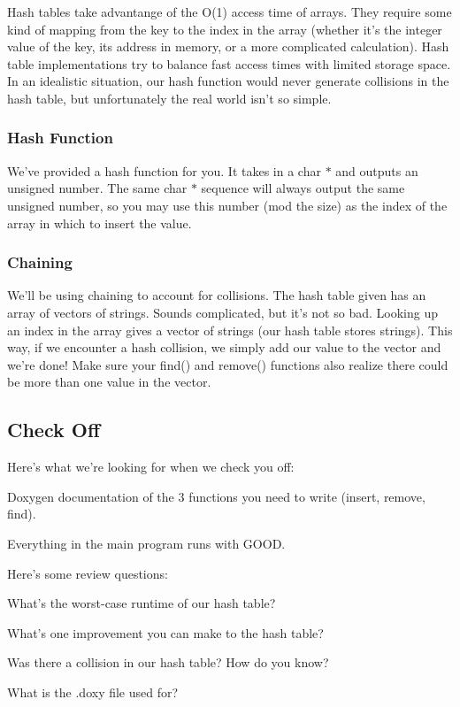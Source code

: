 Hash tables take advantange of the O(1) access time of arrays. They require some kind of mapping from the key to the index in the array (whether it's the integer value of the key, its address in memory, or a more complicated calculation). Hash table implementations try to balance fast access times with limited storage space. In an idealistic situation, our hash function would never generate collisions in the hash table, but unfortunately the real world isn't so simple.

\subsubsection*{Hash Function}

We've provided a hash function for you. It takes in a char $\ast$ and outputs an unsigned number. The same char $\ast$ sequence will always output the same unsigned number, so you may use this number (mod the size) as the index of the array in which to insert the value.

\subsubsection*{Chaining}

We'll be using chaining to account for collisions. The hash table given has an array of vectors of strings. Sounds complicated, but it's not so bad. Looking up an index in the array gives a vector of strings (our hash table stores strings). This way, if we encounter a hash collision, we simply add our value to the vector and we're done! Make sure your find() and remove() functions also realize there could be more than one value in the vector.

\subsection*{Check Off}

Here's what we're looking for when we check you off\-:


\begin{DoxyItemize}
\item Doxygen documentation of the 3 functions you need to write (insert, remove, find).
\item Everything in the main program runs with G\-O\-O\-D.
\end{DoxyItemize}

Here's some review questions\-:


\begin{DoxyItemize}
\item What's the worst-\/case runtime of our hash table?
\item What's one improvement you can make to the hash table?
\item Was there a collision in our hash table? How do you know?
\item What is the .doxy file used for? 
\end{DoxyItemize}